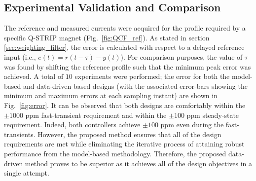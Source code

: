\documentclass[journal]{IEEEtran}
\begin{document}
{\subsection{Experimental Validation and Comparison}
The reference and measured currents were acquired for the profile required by a specific Q-STRIP magnet (Fig.~\ref{fig:QCF_ref}). As stated in section \ref{sec:weighting_filter}, the error is calculated with respect to a delayed reference input (i.e., $e(t) = r(t-\tau) - y(t)$). For comparison purposes,  the value of $\tau$ was found by shifting the reference profile such that the minimum peak error was achieved. A total of $10$ experiments were performed; the error for both the model-based and data-driven based designs (with the associated error-bars showing the minimum and maximum errors at each sampling instant) are shown in Fig.~\ref{fig:error}. It can be observed that both designs are comfortably within the $\pm 1000$ ppm fast-transient requirement and within the $\pm 100$ ppm steady-state requirement. Indeed, both controllers achieve $\pm 100$ ppm even during the fast-transients. However, the proposed method ensures that all of the design requirements are met while eliminating the iterative process of attaining robust performance from the model-based methodology. Therefore, the proposed data-driven method proves to be superior as it achieves all of the design objectives in a single attempt. 


}
\end{document}
